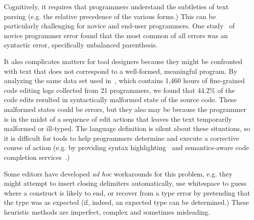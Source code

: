 
Cognitively, it requires that programmers understand the subtleties of text parsing (e.g. the relative precedence of the various forms.) This can be particularly challenging for novice and end-user programmers.
One study~\cite{Altadmri:2015:MCI:2676723.2677258} of novice programmer error found that the most common of all errors was an syntactic error, specifically unbalanced parenthesis.

It also complicates matters for tool designers because they might be confronted with text that does not correspond to a well-formed, meaningful program.
By analyzing the same data set used in~\cite{6883030}, which contains 1,460 hours of fine-grained code editing logs collected from 21 programmers, we found that 44.2\% of the code edits resulted in syntactically malformed state of the source code.
These malformed states could be errors, but they also may be because the programmer is in the midst of a sequence of edit actions that leaves the text temporarily malformed or ill-typed.
The language definition is silent about these situations, so it is difficult for tools to help programmers determine and execute a corrective course of action (e.g. by providing syntax highlighting~\cite{sarkar2015impact} and semantics-aware code completion services~\cite{Mooty:2010:CCC:1915084.1916348}.)

Some editors have developed \emph{ad hoc} workarounds for this problem, e.g. they might attempt to insert closing delimiters automatically, use whitespace to guess where a construct is likely to end, or recover from a type error by pretending that the type was as expected (if, indeed, an expected type can be determined.) These heuristic methods are imperfect, complex and sometimes misleading.


